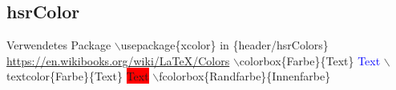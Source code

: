 \subsection{hsrColor}
Verwendetes Package $\backslash$usepackage\{xcolor\} in \{header/hsrColors\}\newline
 \url{https://en.wikibooks.org/wiki/LaTeX/Colors}\newline
$\backslash$colorbox\{Farbe\}\{Text\} \hspace{1cm} \textcolor{blue}{Text}\newline
$\backslash$textcolor\{Farbe\}\{Text\} \hspace{1cm} \colorbox{red}{Text}\newline
$\backslash$fcolorbox\{Randfarbe\}\{Innenfarbe\} \hspace{1cm} 

